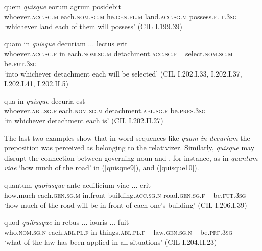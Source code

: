 \begin{exe}
\ex
\gll quem \emph{quisque} eorum agrum posidebit\\
whoever.\textsc{acc.sg.m} each.\textsc{nom.sg.m} he.\textsc{gen.pl.m} land.\textsc{acc.sg.m} possess.\textsc{fut.3sg}\\
\trans `whichever land each of them will possess' (CIL I.199.39)
\label{quisque6}
\end{exe}

\begin{exe}
\ex
\gll quam in \emph{quisque} decuriam ... lectus erit\\
whoever.\textsc{acc.sg.f} in each.\textsc{nom.sg.m} detachment.\textsc{acc.sg.f} ~ select.\textsc{nom.sg.m} be.\textsc{fut.3sg}\\
\trans `into whichever detachment each will be selected' (CIL I.202.I.33, I.202.I.37, I.202.I.41, I.202.II.5) 
\label{quisque7}
\end{exe}

\begin{exe}
\ex
\gll qua in \emph{quisque} decuria est\\
whoever.\textsc{abl.sg.f} each.\textsc{nom.sg.m} detachment.\textsc{abl.sg.f} be.\textsc{pres.3sg}\\
\trans `in whichever detachment each is' (CIL I.202.II.27) 
\label{quisque8}
\end{exe}

The last two examples show that in word sequences like \emph{quam in decuriam} the preposition was perceived as belonging to the relativizer. Similarly, \emph{quisque} may disrupt the connection between governing noun and , for instance, as in \emph{quantum viae} `how much of the road' in (\ref{quisque9}), and (\ref{quisque10}).

\begin{exe}
\ex
\gll quantum \emph{quoiusque} ante aedificium viae ... erit\\
how.much each.\textsc{gen.sg.m} in.front building.\textsc{acc.sg.n} road.\textsc{gen.sg.f} ~ be.\textsc{fut.3sg}\\
\trans `how much of the road will be in front of each one's building' (CIL I.206.I.39) 
\label{quisque9}
\end{exe}

\begin{exe}
\ex
\gll quod \emph{quibusque} in rebus ... iouris ... fuit\\
who.\textsc{nom.sg.n} each.\textsc{abl.pl.f} in things.\textsc{abl.pl.f} ~ law.\textsc{gen.sg.n} ~ be.\textsc{prf.3sg}\\
\trans `what of the law has been applied in all situations' (CIL I.204.II.23) 
\label{quisque10}
\end{exe}%

